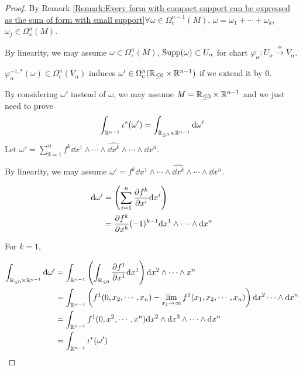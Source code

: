 \begin{proof}
    By Remark \ref{Remark:Every form with compact support can be expressed as the sum of form with small support}$ \forall \omega\in \Omega_c^{n-1}(M) $,  $ \omega=\omega_1+\cdots+\omega_k $,  $ \omega_j\in\Omega_s^n(M) $.
    
    By linearity, we may assume  $ \omega\in \Omega_s^n(M) $,  $ \mathrm{Supp}(\omega)\subset U_\alpha $ for chart  $ \varphi_\alpha:U_\alpha\xrightarrow{\cong}V_\alpha $.
    
     $ \varphi_\alpha^{-1,*}(\omega)\in\Omega_c^n(V_\alpha) $ induces  $ \omega'\in \Omega_c^n(\mathbb R_{\leq 0}\times \mathbb R^{n-1}) $ if we extend it by 0.
     
     By considering  $ \omega' $ instead of  $ \omega $, we may assume  $ M=\mathbb R_{\leq 0}\times\mathbb R^{n-1} $ and we just need to prove 
     \[\int_{\mathbb R^{n-1}}\iota^*(\omega')=\int_{\mathbb R_{\leq 0}\times \mathbb R^{n-1}}\mathrm{d} \omega'\]
     Let  $ \omega'=\sum_{k=1}^nf^k\dd x^1\wedge\cdots\wedge \hat{\dd x^k}\wedge\cdots\wedge\dd x^n $.
     
     By linearity, we may assume  $ \omega'=f^k\dd x^1\wedge\cdots\wedge\hat{\dd x^k}\wedge\cdots\wedge\dd x^n $.
     
    \begin{equation}
        \begin{aligned}
            \mathrm{d} \omega'&=\left(\displaystyle\sum_{i=1}^n\frac{\partial f^k}{\partial x^i}\mathrm{d} x^i\right)\\
            &=\frac{\partial f^k}{\partial x^k}(-1)^{k-1}\mathrm{d} x^1\wedge\cdots\wedge\mathrm{d} x^n
        \end{aligned}
    \end{equation}
    
    For  $ k=1 $,  
    
    \begin{equation*}
        \begin{aligned}
            \int_{\mathbb R_{ \leq 0}\times \mathbb R^{n-1}}\mathrm{d} \omega'&=\int_{\mathbb R^{n-1}}\left(\int_{\mathbb R_{\leq 0}}\frac{\partial f^1}{\partial x^1}\mathrm{d} x^1\right)\mathrm{d} x^2\wedge\cdots\wedge x^n\\
            &=\int_{\mathbb R^{n-1}}\left(f^1(0,x_2,\cdots,x_n)-\displaystyle\lim_{x_1\to\infty}f^1(x_1,x_2,\cdots,x_n)\right)\mathrm{d} x^2\cdots\wedge \mathrm{d} x^n\\
            &=\int_{\mathbb R^{n-1}}f^1(0,x^2,\cdots,x^n)\mathrm{d} x^2\wedge\mathrm{d} x^3\wedge\cdots\wedge\mathrm{d} x^n\\
            &=\int_{\mathbb R^{n-1}}\iota^*(\omega')
        \end{aligned}
    \end{equation*}


\end{proof}
